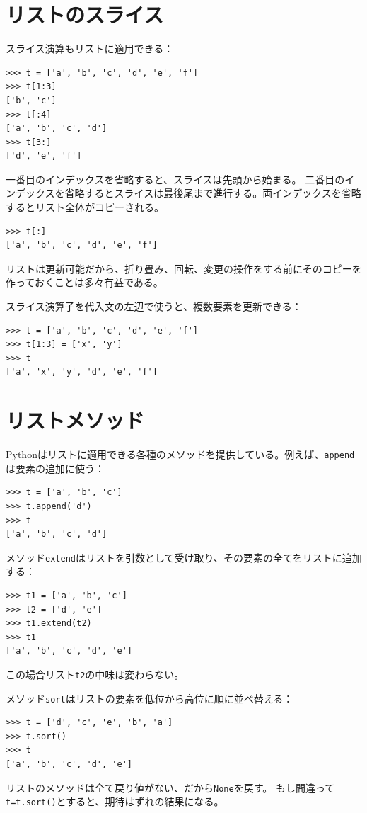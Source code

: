 \documentclass[a4j,12pt,makeidx]{jbook}
\begin{document}
\section{リストのスライス}
スライス演算もリストに適用できる：
\begin{verbatim}
>>> t = ['a', 'b', 'c', 'd', 'e', 'f']
>>> t[1:3]
['b', 'c']
>>> t[:4]
['a', 'b', 'c', 'd']
>>> t[3:]
['d', 'e', 'f']
\end{verbatim}
一番目のインデックスを省略すると、スライスは先頭から始まる。
二番目のインデックスを省略するとスライスは最後尾まで進行する。両インデックスを省略するとリスト全体がコピーされる。
\begin{verbatim}
>>> t[:]
['a', 'b', 'c', 'd', 'e', 'f']
\end{verbatim} \par
リストは更新可能だから、折り畳み、回転、変更の操作をする前にそのコピーを作っておくことは多々有益である。\par
スライス演算子を代入文の左辺で使うと、複数要素を更新できる：
\begin{verbatim}
>>> t = ['a', 'b', 'c', 'd', 'e', 'f']
>>> t[1:3] = ['x', 'y']
>>> t
['a', 'x', 'y', 'd', 'e', 'f']
\end{verbatim}
%
\section{リストメソッド}
Pythonはリストに適用できる各種のメソッドを提供している。例えば、{\tt append}は要素の追加に使う：
\begin{verbatim}
>>> t = ['a', 'b', 'c']
>>> t.append('d')
>>> t
['a', 'b', 'c', 'd']
\end{verbatim} \par
メソッド{\tt extend}はリストを引数として受け取り、その要素の全てをリストに追加する：
\begin{verbatim}
>>> t1 = ['a', 'b', 'c']
>>> t2 = ['d', 'e']
>>> t1.extend(t2)
>>> t1
['a', 'b', 'c', 'd', 'e']
\end{verbatim}
この場合リスト{\tt t2}の中味は変わらない。 \par
メソッド{\tt sort}はリストの要素を低位から高位に順に並べ替える：
\begin{verbatim}
>>> t = ['d', 'c', 'e', 'b', 'a']
>>> t.sort()
>>> t
['a', 'b', 'c', 'd', 'e']
\end{verbatim}
リストのメソッドは全て戻り値がない、だから{\tt None}を戻す。
もし間違って{\tt t=t.sort()}とすると、期待はずれの結果になる。
%
\end{document}
